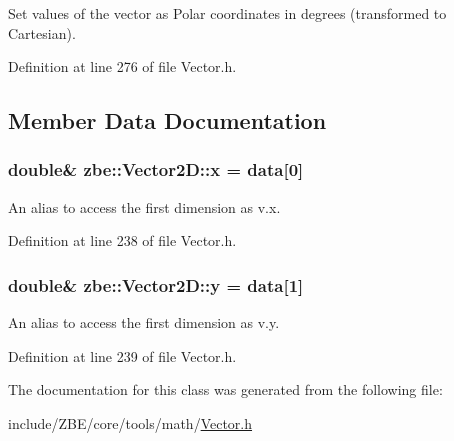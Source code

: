 Set values of the vector as Polar coordinates in degrees (transformed to Cartesian). 



Definition at line 276 of file Vector.\+h.



\subsection{Member Data Documentation}
\hypertarget{classzbe_1_1_vector2_d_a66e8c7ff408370756e48e2fd5f211b4e}{}
\subsubsection[{x}]{\setlength{\rightskip}{0pt plus 5cm}double\& zbe\+::\+Vector2\+D\+::x = {\bf data}\mbox{[}0\mbox{]}}\label{classzbe_1_1_vector2_d_a66e8c7ff408370756e48e2fd5f211b4e}


An alias to access the first dimension as v.\+x. 



Definition at line 238 of file Vector.\+h.

\hypertarget{classzbe_1_1_vector2_d_ab36f8d98268760d53da4efb305533cee}{}
\subsubsection[{y}]{\setlength{\rightskip}{0pt plus 5cm}double\& zbe\+::\+Vector2\+D\+::y = {\bf data}\mbox{[}1\mbox{]}}\label{classzbe_1_1_vector2_d_ab36f8d98268760d53da4efb305533cee}


An alias to access the first dimension as v.\+y. 



Definition at line 239 of file Vector.\+h.



The documentation for this class was generated from the following file\+:\begin{DoxyCompactItemize}
\item 
include/\+Z\+B\+E/core/tools/math/\hyperlink{_vector_8h}{Vector.\+h}\end{DoxyCompactItemize}
